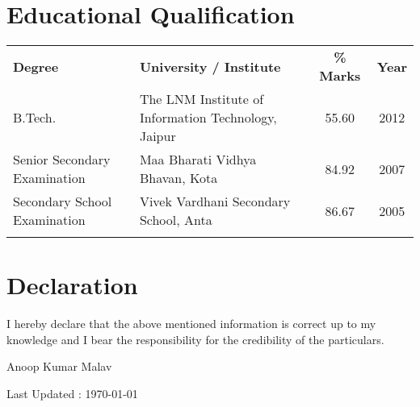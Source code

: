 \documentclass[10pt]{article}
\begin{document}
\section*{Educational Qualification}
\begin{tabular}{l l c c}
\textbf{Degree} & \textbf{University / Institute} & \textbf{\% Marks} & \textbf{Year}\\[0.2cm]
B.Tech. & The LNM Institute of Information Technology, Jaipur  & 55.60 & 2012\\[0.2cm]
Senior Secondary Examination & Maa Bharati Vidhya Bhavan, Kota & 84.92 & 2007\\[0.2cm]
Secondary School Examination & Vivek Vardhani Secondary School, Anta  & 86.67 & 2005\\
 & & & \\
\end{tabular}

\section*{Declaration}
I hereby declare that the above mentioned information is correct up to
my knowledge and I bear the responsibility for the credibility of the particulars.\\
\begin{flushright}
 Anoop Kumar Malav
\end{flushright}
\begin{center}

Last Updated : \today

\end{center}
\end{document}
